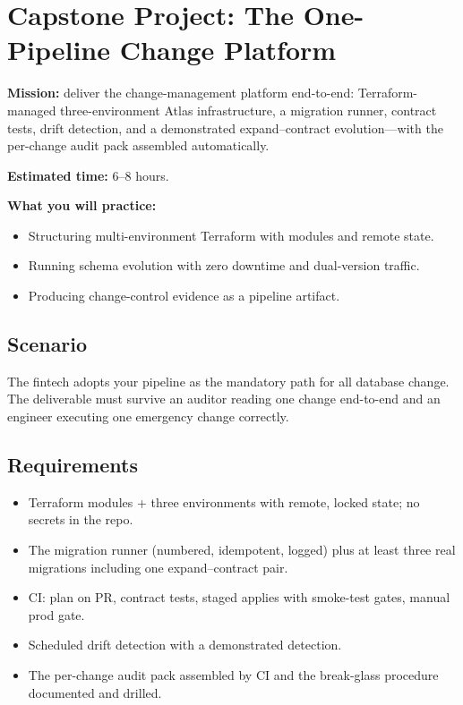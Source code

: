 \section{Capstone Project: The One-Pipeline Change Platform}\label{sec:ch21-capstone}

\begin{capstonebox}
\textbf{Mission:} deliver the change-management platform end-to-end: Terraform-managed three-environment Atlas infrastructure, a migration runner, contract tests, drift detection, and a demonstrated expand--contract evolution---with the per-change audit pack assembled automatically.

\textbf{Estimated time:} 6--8 hours.

\textbf{What you will practice:}
\begin{itemize}
    \item Structuring multi-environment Terraform with modules and remote state.
    \item Running schema evolution with zero downtime and dual-version traffic.
    \item Producing change-control evidence as a pipeline artifact.
\end{itemize}
\end{capstonebox}

\subsection*{Scenario}
The fintech adopts your pipeline as the mandatory path for all database change. The deliverable must survive an auditor reading one change end-to-end and an engineer executing one emergency change correctly.

\subsection*{Requirements}
\begin{itemize}
    \item Terraform modules + three environments with remote, locked state; no secrets in the repo.
    \item The migration runner (numbered, idempotent, logged) plus at least three real migrations including one expand--contract pair.
    \item CI: plan on PR, contract tests, staged applies with smoke-test gates, manual prod gate.
    \item Scheduled drift detection with a demonstrated detection.
    \item The per-change audit pack assembled by CI and the break-glass procedure documented and drilled.
\end{itemize}

